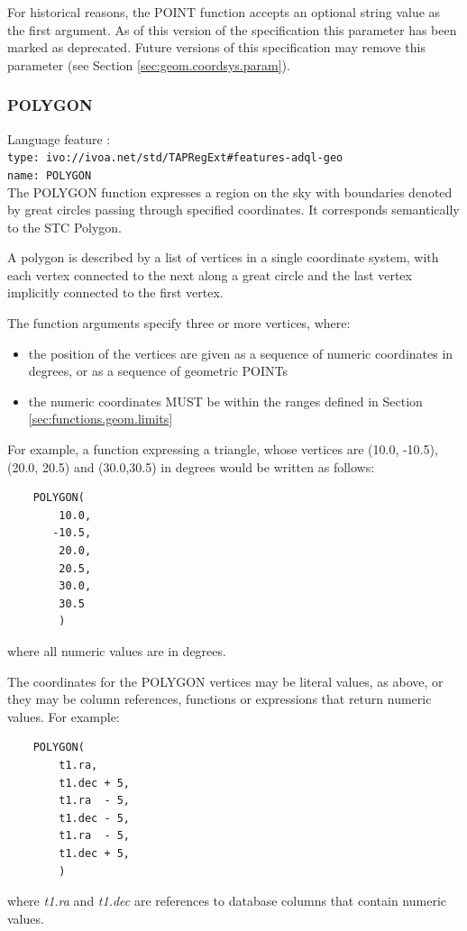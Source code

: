 \documentclass[11pt,a4paper]{ivoa}
\newcommand{\SectionRef}[1]{Section \ref{#1}\xspace}
\newcommand{\SectionSee}[1]{(see Section \ref{#1})\xspace}
\begin{document}
For historical reasons, the POINT function accepts an optional string
value as the first argument.
As of this version of the specification this parameter has been
marked as deprecated.
Future versions of this specification may remove this parameter
\SectionSee{sec:geom.coordsys.param}.

\subsubsection{POLYGON}
\label{sec:functions.geom.polygon}
{\footnotesize Language feature :}\\
{\footnotesize \verb|type: ivo://ivoa.net/std/TAPRegExt#features-adql-geo|}\\
{\footnotesize \verb|name: POLYGON|}\\

The POLYGON function expresses a region on the sky with boundaries denoted by great
circles passing through specified coordinates. It corresponds semantically
to the STC Polygon.

A polygon is described by a list of vertices in a single coordinate system, with
each vertex connected to the next along a great circle and the last vertex
implicitly connected to the first vertex.

The function arguments specify three or more vertices, where:
\begin{itemize}
    \item the position of the vertices are given as a sequence of
    numeric coordinates in degrees, or as a sequence of geometric POINTs
    \item the numeric coordinates MUST be within the ranges defined in
    \SectionRef{sec:functions.geom.limits}
\end{itemize}

For example, a function expressing a triangle, whose vertices are (10.0,
-10.5), (20.0, 20.5) and (30.0,30.5) in degrees would be written
as follows:
\begin{verbatim}
    POLYGON(
        10.0,
       -10.5,
        20.0,
        20.5,
        30.0,
        30.5
        )
\end{verbatim}
\noindent
where all numeric values are in degrees.

The coordinates for the POLYGON vertices may be literal values, as above,
or they may be column references, functions or expressions that return
numeric values.
For example:
\begin{verbatim}
    POLYGON(
        t1.ra,
        t1.dec + 5,
        t1.ra  - 5,
        t1.dec - 5,
        t1.ra  - 5,
        t1.dec + 5,
        )
\end{verbatim}
\noindent
where \textit{t1.ra} and \textit{t1.dec} are references to database columns
that contain numeric values.
\end{document}
